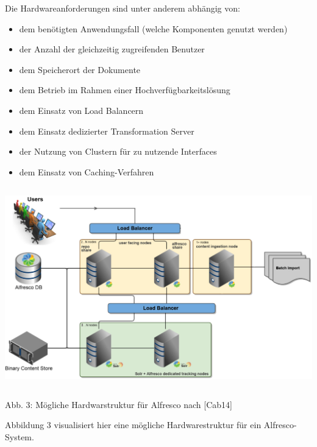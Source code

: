 \documentclass[a4paper]{article}
\newcommand\liststyleWWviiiNumii{%
\renewcommand\labelitemi{{\textbullet}}
\renewcommand\labelitemii{o}
\renewcommand\labelitemiii{${\blacksquare}$}
\renewcommand\labelitemiv{{\textbullet}}
}
\begin{document}
\bigskip

{\sffamily
Die Hardwareanforderungen sind unter anderem abhängig von:}


\bigskip

\liststyleWWviiiNumii
\begin{itemize}
\item {\sffamily
dem benötigten Anwendungsfall (welche Komponenten genutzt werden)}
\item {\sffamily
der Anzahl der gleichzeitig zugreifenden Benutzer}
\item {\sffamily
dem Speicherort der Dokumente}
\item {\sffamily
dem Betrieb im Rahmen einer Hochverfügbarkeitslösung}
\item {\sffamily
dem Einsatz von Load Balancern}
\item {\sffamily
dem Einsatz dedizierter Transformation Server}
\item {\sffamily
der Nutzung von Clustern für zu nutzende Interfaces}
\item {\sffamily
dem Einsatz von Caching-Verfahren}
\end{itemize}

\bigskip

 \includegraphics[width=14.605cm,height=8.724cm]{INMEA5BeckmannMarco-img003.png} 

{\centering\sffamily
Abb. 3: Mögliche Hardwarstruktur für Alfresco nach [Cab14]
\par}


\bigskip

{\sffamily
Abbildung 3 visualisiert hier eine mögliche Hardwarestruktur für ein Alfresco-System. }


\bigskip
\end{document}
